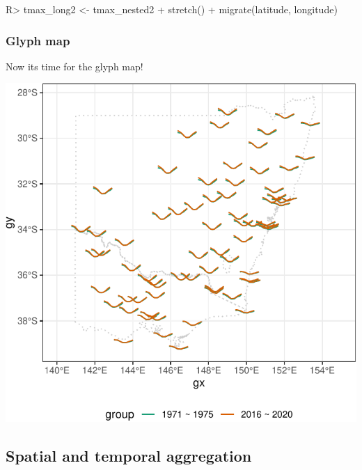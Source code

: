 \documentclass[
]{jss}
\begin{document}
\begin{CodeChunk}
\begin{CodeInput}
R> tmax_long2 <- tmax_nested2 %
+   stretch() %
+   migrate(latitude, longitude)
\end{CodeInput}
\end{CodeChunk}

\hypertarget{glyph-map}{%
\subsubsection{Glyph map}\label{glyph-map}}

Now its time for the glyph map!

\begin{CodeChunk}


\begin{center}\includegraphics{figures/unnamed-chunk-10-1} \end{center}

\end{CodeChunk}

\hypertarget{spatial-and-temporal-aggregation}{%
\subsection{Spatial and temporal
aggregation}\label{spatial-and-temporal-aggregation}}
\end{document}
